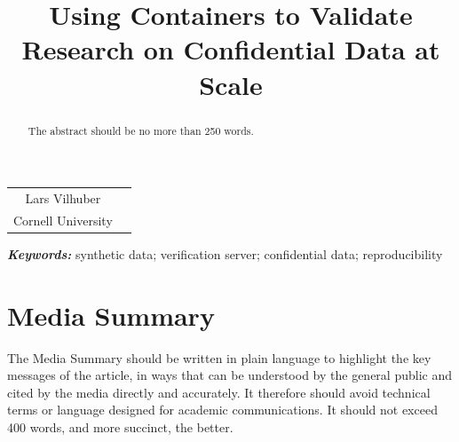 \documentclass[]{hdsr}
\begin{document}




\begin{center}

  \title{Using Containers to Validate Research on Confidential Data at Scale}
  \maketitle

  \thispagestyle{empty}
  
  \vspace*{.2in}

  \begin{tabular}{cc}
    Lars Vilhuber\upstairs{\affilone,*}
   \\[0.25ex]
   {\small \upstairs{\affilone} Cornell University} \\
  \end{tabular}
  
  \vspace*{0.4in}

\begin{abstract}
The abstract should be no more than 250 words.
\end{abstract}
\end{center}

\vspace*{0.15in}
\hspace{10pt}
  \small	
  \textbf{\textit{Keywords: }} {synthetic data; verification server; confidential data; reproducibility}
  
\copyrightnotice

\section*{Media Summary}
The Media Summary should be written in plain language to highlight the key messages of
the article, in ways that can be understood by the general public and cited by the media 
directly and accurately.  It therefore should avoid technical terms or language designed for
academic communications. It should not exceed 400 words, and more succinct, the better.
\end{document}
